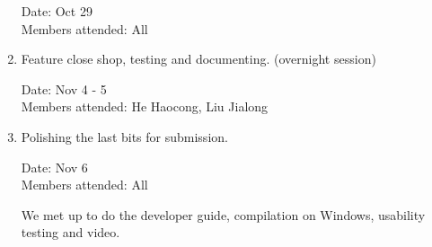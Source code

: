 \documentclass[12pt, a4paper]{article}
\begin{document}
\begin{enumerate}
Date: Oct 29\\
Members attended: All

\item Feature close shop, testing and documenting. (overnight session)

Date: Nov 4 - 5\\
Members attended: He Haocong, Liu Jialong

\item Polishing the last bits for submission.

Date: Nov 6\\
Members attended: All

We met up to do the developer guide, compilation on Windows, usability testing and video.
\end{enumerate}
\end{document}
